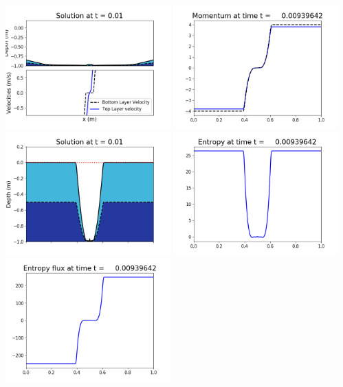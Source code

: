 \documentclass[11pt]{article}
\begin{document}
\includegraphics[width=0.475\textwidth]{frame0059fig1002.png}
\vskip 10pt 
\includegraphics[width=0.475\textwidth]{frame0059fig1003.png}
\includegraphics[width=0.475\textwidth]{frame0059fig1006.png}
\vskip 10pt 
\includegraphics[width=0.475\textwidth]{frame0059fig1007.png}
\includegraphics[width=0.475\textwidth]{frame0059fig1008.png}
\end{document}
